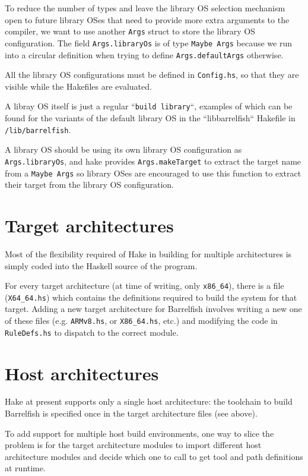 \documentclass[a4paper,twoside]{report} %
\begin{document}
To reduce the number of types and leave the library OS selection mechanism
open to future library OSes that need to provide more extra arguments to the
compiler, we want to use another \verb|Args| struct to store the library OS
configuration.
The field \verb|Args.libraryOs| is of type \verb|Maybe Args| because we run
into a circular definition when trying to define \verb|Args.defaultArgs|
otherwise.

All the library OS configurations must be defined in \texttt{Config.hs}, so
that they are visible while the Hakefiles are evaluated.

A libray OS itself is just a regular ``\texttt{build library}``, examples of
which can be found for the variants of the default library OS in the
``libbarrelfish`` Hakefile in \texttt{/lib/barrelfish}.

A library OS should be using its own library OS configuration as
\verb|Args.libraryOs|, and hake provides \verb|Args.makeTarget| to extract the
target name from a \verb|Maybe Args| so library OSes are encouraged to use
this function to extract their target from the library OS configuration.

\section{Target architectures}

Most of the flexibility required of Hake in building for multiple
architectures is simply coded into the Haskell source of the program.

For every target architecture (at time of writing, only
\texttt{x86\_64}), there is a file (\texttt{X64\_64.hs}) which
contains the definitions required to build the system for that
target.   Adding a new target architecture for Barrelfish involves
writing a new one of these files (e.g. \texttt{ARMv8.hs}, or
\texttt{X86\_64.hs}, etc.) and modifying the code in
\texttt{RuleDefs.hs} to dispatch to the correct module.

\section{Host architectures}

Hake at present supports only a single host architecture: the
toolchain to build Barrelfish is specified once in the target
architecture files (see above).

To add support for multiple host build environments, one way to slice the
problem is for the target architecture modules to import different
host architecture modules and decide which one to call to get tool and
path definitions at runtime.
\end{document}
